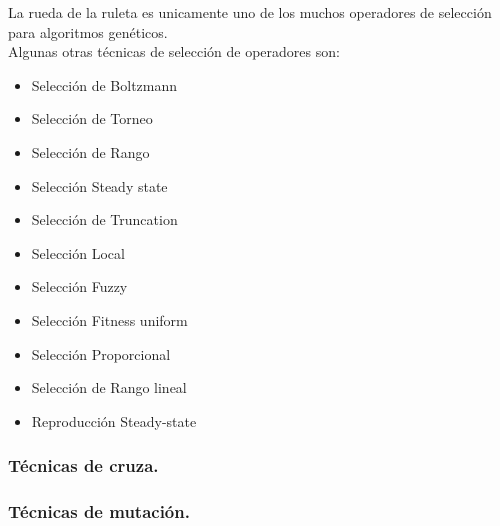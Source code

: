 \documentclass[12pt,letterpaper]{report}
\begin{document}
La rueda de la ruleta es unicamente uno de los muchos operadores de selección para algoritmos genéticos.
\\

Algunas otras técnicas de selección de operadores son:
\begin{itemize}
\item Selección de Boltzmann
\item Selección de Torneo
\item Selección de Rango
\item Selección Steady state
\item Selección de Truncation 
\item Selección Local
\item Selección Fuzzy
\item Selección Fitness uniform 
\item Selección Proporcional
\item Selección de Rango lineal  
\item Reproducción Steady-state

\end{itemize}


\subsubsection{Técnicas de cruza.}
\subsubsection{Técnicas de mutación.}
\pagebreak
\end{document}
